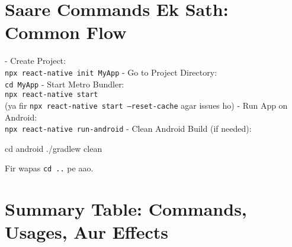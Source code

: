 \documentclass[a4paper]{article}
\newcommand\imp[1]{{\color{ImportantRed}#1}}
\begin{document}
\section*{Saare Commands Ek Sath: Common Flow}
- \imp{Create Project:}\\
  \texttt{npx react-native init MyApp}
- \imp{Go to Project Directory:}\\
  \texttt{cd MyApp}
- \imp{Start Metro Bundler:}\\
  \texttt{npx react-native start}\\
  (ya fir \texttt{npx react-native start --reset-cache} agar issues ho)
- \imp{Run App on Android:}\\
  \texttt{npx react-native run-android}
- \imp{Clean Android Build (if needed):}
  \begin{codeblock}
cd android
./gradlew clean
\end{codeblock}
  Fir wapas \texttt{cd ..} pe aao.

\vspace{0.5em}
\section*{Summary Table: Commands, Usages, Aur Effects}
\end{document}
